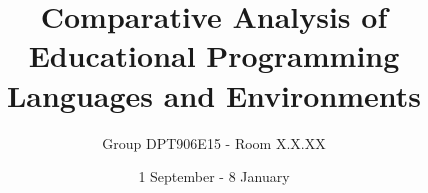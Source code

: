 \usepackage[english]{babel}
\usepackage[utf8]{inputenc}
\usepackage[T1]{fontenc}
\usepackage{graphicx}
\usepackage{lscape}%
\usepackage{cite}
\usepackage{setspace}
\usepackage[hyphens]{url}
\usepackage{times}
\usepackage[backref]{hyperref}
\usepackage{verbatim}
\usepackage{wrapfig} %
\usepackage{float}
\usepackage{listings}
\usepackage{color}
\usepackage{textcomp}
\usepackage{mathtools}
\usepackage{fullpage}
\usepackage{lastpage}
\usepackage{pdfpages}
\usepackage{enumitem}
\usepackage{amsfonts} %
\usepackage{booktabs}
\usepackage{multirow}
\usepackage{caption}
\usepackage{subcaption}
\usepackage[babel=true,strict=true,german=quotes,threshold=1]{csquotes}
\usepackage{tikz}
\usepackage{pgfplots}
\usepackage{enumitem}
\usetikzlibrary{patterns}
\pgfplotsset{width=7cm,compat=1.10}


\usepackage{listings}

\setlength{\parindent}{0pt}
\setlength{\parskip}{1.5ex}

\title{Comparative Analysis of Educational Programming Languages and Environments}
\author{Group DPT906E15 - Room X.X.XX}
\date{1 September - 8 January}

\newcommand{\figref}[1]{Figure~\ref{#1}}
\newcommand{\secref}[1]{Section~\ref{#1}}
\newcommand{\tabref}[1]{Table~\ref{#1}}
\newcommand{\chapref}[1]{Chapter~\ref{#1}}
\newcommand{\appref}[1]{Appendix~\ref{#1}}
\newcommand{\partref}[1]{Part~\ref{#1}}
\newcommand{\lstref}[1]{Listing~\ref{#1}}
\newcommand{\algoref}[1]{Algorithm~\ref{#1}}
\newcommand{\hypref}[1]{Hypothesis~\ref{#1}}
\newcommand{\equref}[1]{Equation~\eqref{#1}}
\newcommand\todo[1]{\textcolor{red}{TODO: #1}} %